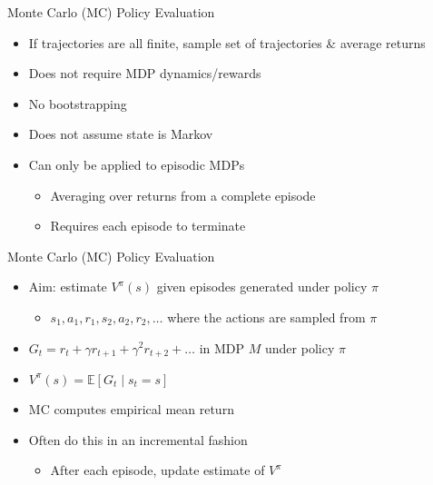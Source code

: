 \documentclass[aspectratio=169]{../latex_main/tntbeamer}  %
\begin{document}
\begin{frame}[c]{Monte Carlo (MC) Policy Evaluation}

\begin{itemize}
	\item If trajectories are all finite, sample set of trajectories \& average returns
	\item Does \alert{not} require MDP dynamics/rewards
	\item No bootstrapping
	\item Does not assume state is Markov
	\item Can only be applied to episodic MDPs
	\begin{itemize}
		\item Averaging over returns from a complete episode
		\item Requires each episode to terminate
	\end{itemize}
\end{itemize}

\end{frame}
\begin{frame}[c]{Monte Carlo (MC) Policy Evaluation}

\begin{itemize}
	\item Aim: estimate $V^\pi (s)$ given episodes generated under policy $\pi$
	\begin{itemize}
		\item $s_1, a_1, r_1, s_2, a_2, r_2, \ldots$ where the actions are sampled from $\pi$
	\end{itemize}
	\item $G_t = r_t + \gamma r_{t+1} + \gamma^2 r_{t+2} + \ldots$ in MDP $M$ under policy $\pi$
	\item $V^\pi (s) = \mathbb{E} [G_t \mid s_t = s]$
	\item MC computes empirical mean return
	\item Often do this in an incremental fashion
	\begin{itemize}
		\item After each episode, update estimate of $V^\pi$
	\end{itemize}
\end{itemize}

\end{frame}
\end{document}

